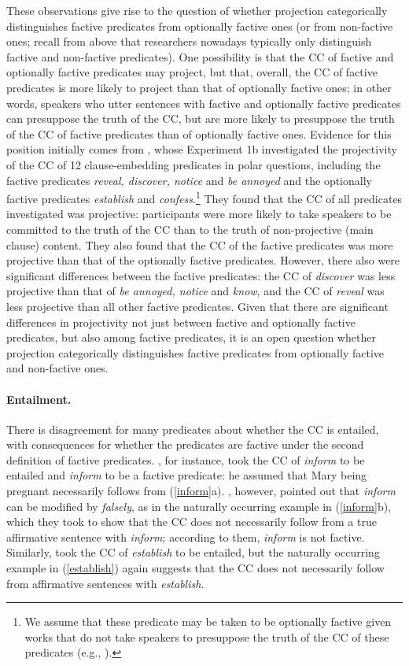 \documentclass[11pt,fleqn]{article}
\newcommand{\6}{\mbox{$[\hspace*{-.6mm}[$}}
\newcommand{\9}{\mbox{$]\hspace*{-.6mm}]$}}
\begin{document}
These observations give rise to the question of whether projection categorically distinguishes factive predicates from optionally factive ones (or from non-factive ones; recall from above that researchers nowadays typically only distinguish factive and non-factive predicates). One possibility is that the CC of factive and optionally factive predicates may project, but that, overall, the CC of factive predicates is more likely to project than that of optionally factive ones; in other words, speakers who utter sentences with factive and optionally factive predicates can presuppose the truth of the CC, but are more likely to presuppose the truth of the CC of factive predicates than of optionally factive ones. Evidence for this position initially comes from \citealt*{tbd-variability}, whose Experiment 1b investigated the projectivity of the CC of 12 clause-embedding predicates in polar questions, including the factive predicates {\em reveal, discover, notice} and {\em be annoyed} and the optionally factive predicates {\em establish} and {\em confess}.\footnote{We assume that these predicate may be taken to be optionally factive given works that do not take speakers to presuppose the truth of the CC of these predicates (e.g., \citealt{wyse,swanson2012,karttunen2016}).} They found that the CC of all predicates investigated was projective: participants were more likely to take speakers to be committed to the truth of the CC than to the truth of non-projective (main clause) content. They also found that the CC of the factive predicates was more projective than that of the optionally factive predicates. However, there also were significant differences between the factive predicates: the CC of {\em discover} was less projective than that of {\em be annoyed, notice} and {\em know}, and the CC of {\em reveal} was less projective than all other factive predicates. Given that there are significant differences in projectivity not just between factive and optionally factive predicates, but also among factive predicates, it is an open question whether projection categorically distinguishes factive predicates from optionally factive and non-factive  ones.

\paragraph{Entailment.} There is disagreement for many predicates about whether the CC is entailed, with consequences for whether the predicates are factive under the second definition of factive predicates. \citet[139]{schlenker10}, for instance, took the CC of {\em inform} to be entailed and {\em inform} to be a factive predicate: he assumed that Mary being pregnant necessarily follows from (\ref{inform}a). \citet[76]{anand-hacquard2014}, however, pointed out that {\em inform} can be modified by {\em falsely}, as in the naturally occurring example in (\ref{inform}b), which they took to show that the CC does not necessarily follow from a true affirmative sentence with {\em inform}; according to them, {\em inform} is not factive. Similarly, \citet{swanson2012} took the CC of {\em establish} to be entailed, but the naturally occurring example in (\ref{establish}) again suggests that the CC does not necessarily follow from affirmative sentences with {\em establish}.
\end{document}
